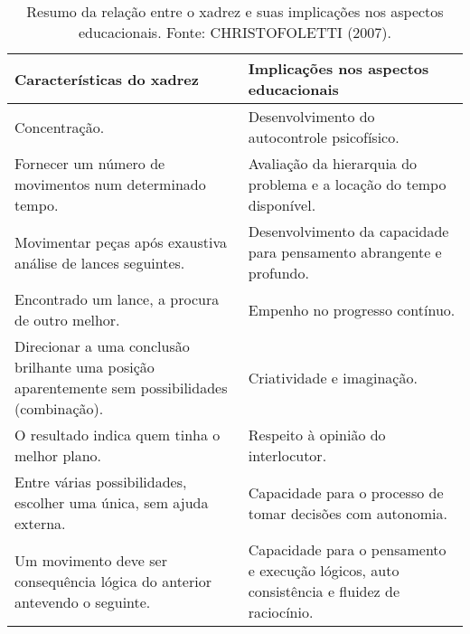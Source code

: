 \documentclass[article,12pt,onesidea,4paper,english,brazil]{abntex2}
\begin{document}
	\begin{longtable}{|p{.45\linewidth}|p{.45\linewidth}|}
		\caption{Resumo da relação entre o xadrez e suas implicações nos aspectos educacionais. Fonte: CHRISTOFOLETTI (2007).}
		\label{my-label} 
		\endfirsthead
		\endhead
		\hline
		\textbf{Características do xadrez}                                                              & \textbf{Implicações nos aspectos educacionais}                                              \\ \hline
		Concentração.                                                                                   & Desenvolvimento do autocontrole psicofísico.                                                \\ \hline
		Fornecer um número de movimentos num determinado tempo.                                         & Avaliação da hierarquia do problema e a locação do tempo disponível.                        \\ \hline
		Movimentar peças após exaustiva análise de lances seguintes.                                    & Desenvolvimento da capacidade para pensamento abrangente e profundo.                        \\ \hline
		Encontrado um lance, a procura de outro melhor.                                                 & Empenho no progresso contínuo.                                                              \\ \hline
		Direcionar a uma conclusão brilhante uma posição aparentemente sem possibilidades (combinação). & Criatividade e imaginação.                                                                  \\ \hline
		O resultado indica quem tinha o melhor plano.                                                   & Respeito à opinião do interlocutor.                                                         \\ \hline
		Entre várias possibilidades, escolher uma única, sem ajuda externa.                             & Capacidade para o processo de tomar decisões com autonomia.                                 \\ \hline
		Um movimento deve ser consequência lógica do anterior antevendo o seguinte.                     & Capacidade para o pensamento e execução lógicos, auto consistência e fluidez de raciocínio. \\ \hline
	\end{longtable}
\end{document}
